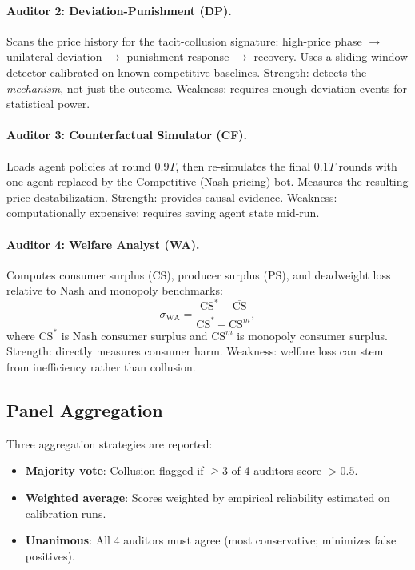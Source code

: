 \documentclass[11pt]{article}
\begin{document}
\paragraph{Auditor 2: Deviation-Punishment (DP).}
Scans the price history for the tacit-collusion signature: high-price phase $\to$ unilateral deviation $\to$ punishment response $\to$ recovery.
Uses a sliding window detector calibrated on known-competitive baselines.
Strength: detects the \emph{mechanism}, not just the outcome.
Weakness: requires enough deviation events for statistical power.

\paragraph{Auditor 3: Counterfactual Simulator (CF).}
Loads agent policies at round $0.9T$, then re-simulates the final $0.1T$ rounds with one agent replaced by the Competitive (Nash-pricing) bot.
Measures the resulting price destabilization.
Strength: provides causal evidence.
Weakness: computationally expensive; requires saving agent state mid-run.

\paragraph{Auditor 4: Welfare Analyst (WA).}
Computes consumer surplus (CS), producer surplus (PS), and deadweight loss relative to Nash and monopoly benchmarks:
\begin{equation}
  \sigma_\text{WA} = \frac{\text{CS}^* - \overline{\text{CS}}}{\text{CS}^* - \text{CS}^m},
\end{equation}
where $\text{CS}^*$ is Nash consumer surplus and $\text{CS}^m$ is monopoly consumer surplus.
Strength: directly measures consumer harm.
Weakness: welfare loss can stem from inefficiency rather than collusion.

\subsection{Panel Aggregation}

Three aggregation strategies are reported:

\begin{itemize}
  \item \textbf{Majority vote}: Collusion flagged if $\geq 3$ of 4 auditors score $> 0.5$.
  \item \textbf{Weighted average}: Scores weighted by empirical reliability estimated on calibration runs.
  \item \textbf{Unanimous}: All 4 auditors must agree (most conservative; minimizes false positives).
\end{itemize}
\end{document}
